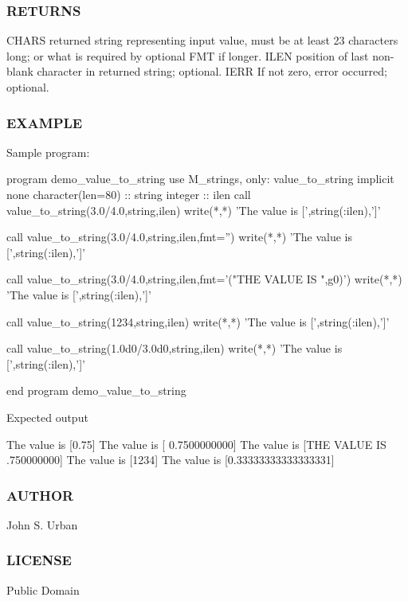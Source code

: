 \subsubsection*{R\+E\+T\+U\+R\+NS}

C\+H\+A\+RS returned string representing input value, must be at least 23 characters long; or what is required by optional F\+MT if longer. I\+L\+EN position of last non-\/blank character in returned string; optional. I\+E\+RR If not zero, error occurred; optional. \subsubsection*{E\+X\+A\+M\+P\+LE}

\begin{DoxyVerb}Sample program:

  program demo_value_to_string
  use M_strings, only: value_to_string
  implicit none
  character(len=80) :: string
  integer           :: ilen
     call value_to_string(3.0/4.0,string,ilen)
     write(*,*) 'The value is [',string(:ilen),']'

     call value_to_string(3.0/4.0,string,ilen,fmt='')
     write(*,*) 'The value is [',string(:ilen),']'

     call value_to_string(3.0/4.0,string,ilen,fmt='("THE VALUE IS ",g0)')
     write(*,*) 'The value is [',string(:ilen),']'

     call value_to_string(1234,string,ilen)
     write(*,*) 'The value is [',string(:ilen),']'

     call value_to_string(1.0d0/3.0d0,string,ilen)
     write(*,*) 'The value is [',string(:ilen),']'

  end program demo_value_to_string

Expected output

 The value is [0.75]
 The value is [      0.7500000000]
 The value is [THE VALUE IS .750000000]
 The value is [1234]
 The value is [0.33333333333333331]
\end{DoxyVerb}


\subsubsection*{A\+U\+T\+H\+OR}

John S. Urban \subsubsection*{L\+I\+C\+E\+N\+SE}

Public Domain 


